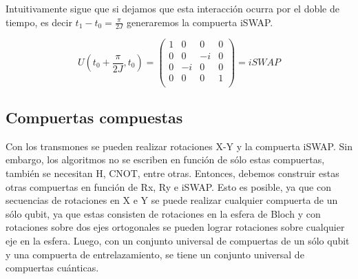 Intuitivamente sigue que si dejamos que esta interacción ocurra por el doble de tiempo, es decir $t_1 - t_0 = \frac{\pi}{2J}$ generaremos la compuerta iSWAP.

\begin{equation}
    U(t_0 + \frac{\pi}{2J}, t_0) = 
    \begin{pmatrix}
        1 & 0 & 0 & 0 \\
        0 & 0 & -i & 0 \\
        0 & -i & 0 & 0 \\
        0 & 0 & 0 & 1 \\
    \end{pmatrix} = iSWAP
\end{equation}

\subsection{Compuertas compuestas}

Con los transmones se pueden realizar rotaciones X-Y y la compuerta iSWAP. Sin embargo, los algoritmos no se escriben en función de sólo estas compuertas, también se necesitan H, CNOT, entre otras. Entonces, debemos construir estas otras compuertas en función de Rx, Ry e iSWAP. Esto es posible, ya que con secuencias de rotaciones en X e Y se puede realizar cualquier compuerta de un sólo qubit, ya que estas consisten de rotaciones en la esfera de Bloch y con rotaciones sobre dos ejes ortogonales se pueden lograr rotaciones sobre cualquier eje en la esfera. Luego, con un conjunto universal de compuertas de un sólo qubit y una compuerta de entrelazamiento, se tiene un conjunto universal de compuertas cuánticas.

